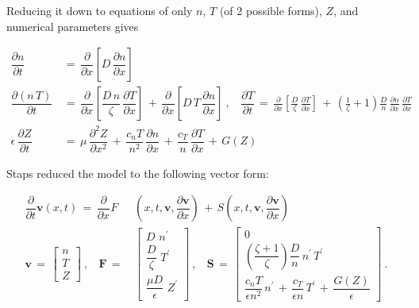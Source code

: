 \documentclass[a4paper,8pt]{article}
\begin{document}
\normalsize

Reducing it down to equations of only \(n\), \(T\) (of 2 possible
forms), \(Z\), and numerical parameters gives \small

\begin{align}
    \dfrac{\partial n}{\partial t} \,&=\, \dfrac{\partial}{\partial x}\left[D \, \dfrac{\partial n}{\partial x}\right] \\
    \dfrac{\partial(n\,T)}{\partial t} \,&=\, \dfrac{\partial}{\partial x}\left[\dfrac{D\,n}{\zeta} \, \dfrac{\partial T}{\partial x}\right] \,+\, \dfrac{\partial}{\partial x}\left[D\,T \, \dfrac{\partial n}{\partial x}\right]~, ~~~~ \dfrac{\partial T}{\partial t} \,=\, \frac{\partial }{\partial x}\left[\frac{D}{\zeta} \, \frac{\partial T}{\partial x}\right] \,+\, \left(\frac{1}{\zeta} + 1\right) \frac{D}{n} \, \frac{\partial n}{\partial x} \, \frac{\partial T}{\partial x} \\
    \epsilon \, \dfrac{\partial Z}{\partial t} \,&=\, \mu \, \dfrac{\partial^2 Z}{\partial x^2} \,+\, \dfrac{c_n T}{n^2} \, \dfrac{\partial n}{\partial x} \,+\, \dfrac{c_T}{n} \, \dfrac{\partial T}{\partial x} \,+\, G(Z)
\end{align}

\normalsize

Staps reduced the model to the following vector form: \small

\begin{align}
    \dfrac{\partial}{\partial t} \mathbf{v}(x,t) \,=\, \dfrac{\partial}{\partial x} F&\left(x, t, \mathbf{v}, \dfrac{\partial\mathbf{v}}{\partial x}\right) \,+\, S\left(x, t, \mathbf{v}, \dfrac{\partial\mathbf{v}}{\partial x}\right) \\
\mathbf{v} \,=\,\begin{bmatrix} n \\[1ex] T \\[1ex] Z \end{bmatrix}~,~~~~
\mathbf{F} \,=\, &\begin{bmatrix}
            D\,\, n^\prime \\[1ex]
            \dfrac{D}{\zeta}\,\, T^\prime \\[2ex]
            \dfrac{\mu D}{\epsilon}\,\, Z^\prime
            \end{bmatrix}~,~~~~
\mathbf{S} \,=\, \begin{bmatrix}
            0 \\[1ex]
            \left(\dfrac{\zeta + 1}{\zeta}\right) \dfrac{D}{n} \, n^\prime \, T^\prime \\[2ex]
            \dfrac{c_n T}{\epsilon n^2} \, n^\prime \,+\, \dfrac{c_T}{\epsilon n} \, T^\prime \,+\, \dfrac{G(Z)}{\epsilon}
            \end{bmatrix}~.
\end{align}
\end{document}

